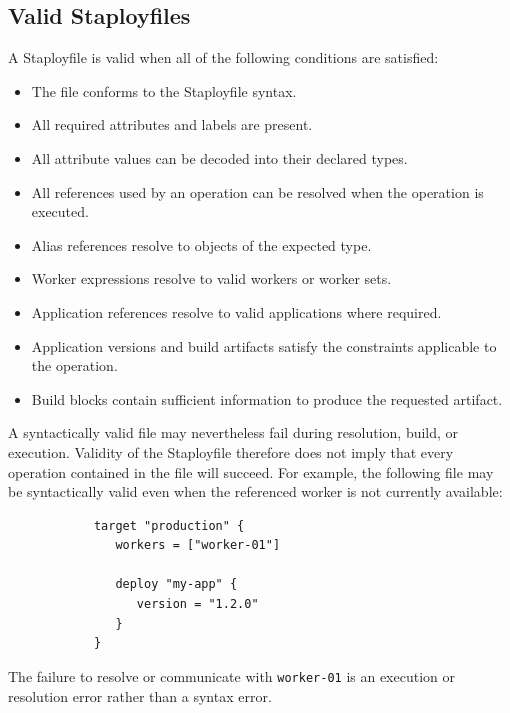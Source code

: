 \documentclass[11pt,a4paper]{article}
\begin{document}
    \subsection{Valid Staployfiles}\label{subsec:valid-staployfiles}

    A Staployfile is valid when all of the following conditions are satisfied:

    \begin{itemize}
        \item The file conforms to the Staployfile syntax.
        \item All required attributes and labels are present.
        \item All attribute values can be decoded into their declared types.
        \item All references used by an operation can be resolved when the operation is executed.
        \item Alias references resolve to objects of the expected type.
        \item Worker expressions resolve to valid workers or worker sets.
        \item Application references resolve to valid applications where required.
        \item Application versions and build artifacts satisfy the constraints applicable to the operation.
        \item Build blocks contain sufficient information to produce the requested artifact.
    \end{itemize}

    A syntactically valid file may nevertheless fail during resolution, build, or execution.
    Validity of the Staployfile therefore does not imply that every operation contained in the file will succeed.
    For example, the following file may be syntactically valid even when the referenced worker is not currently available:

    \begin{center}
        \begin{verbatim}
            target "production" {
               workers = ["worker-01"]

               deploy "my-app" {
                  version = "1.2.0"
               }
            }
        \end{verbatim}
    \end{center}

    The failure to resolve or communicate with \texttt{worker-01} is an execution or resolution error rather than a syntax error.
\end{document}
